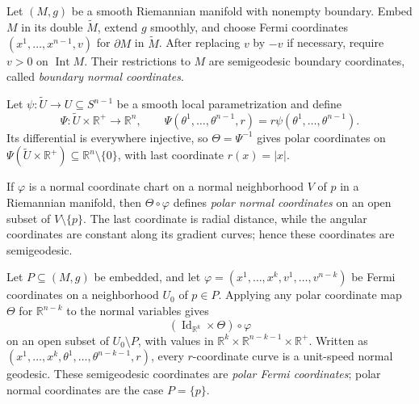 \begin{example}
\label{ex:boundary-normal-coordinates}

Let $(M,g)$ be a smooth Riemannian manifold with nonempty boundary. Embed $M$
in its double $\widetilde M$, extend $g$ smoothly, and choose Fermi coordinates
$(x^1,\ldots,x^{n-1},v)$ for $\partial M$ in $\widetilde M$. After replacing
$v$ by $-v$ if necessary, require $v>0$ on $\operatorname{Int}M$. Their
restrictions to $M$ are semigeodesic boundary coordinates, called
\emph{boundary normal coordinates}.
\end{example}

\begin{example}
\label{ex:polar-normal-coordinates}

Let $\psi:\widetilde U\to U\subseteq S^{n-1}$ be a smooth local
parametrization and define
\[
\Psi:\widetilde U\times\mathbb R^+\to\mathbb R^n,
\qquad
\Psi(\theta^1,\ldots,\theta^{n-1},r)=r\psi(\theta^1,\ldots,\theta^{n-1}).
\]
Its differential is everywhere injective, so $\Theta=\Psi^{-1}$ gives polar
coordinates on
$\Psi(\widetilde U\times\mathbb R^+)\subseteq\mathbb R^n\setminus\{0\}$,
with last coordinate $r(x)=|x|$.

If $\varphi$ is a normal coordinate chart on a normal neighborhood $V$ of
$p$ in a Riemannian manifold, then $\Theta\circ\varphi$ defines
\emph{polar normal coordinates} on an open subset of $V\setminus\{p\}$. The
last coordinate is radial distance, while the angular coordinates are constant
along its gradient curves; hence these coordinates are semigeodesic.
\end{example}

\begin{example}
\label{ex:polar-fermi-coordinates}

Let $P\subseteq(M,g)$ be embedded, and let
$\varphi=(x^1,\ldots,x^k,v^1,\ldots,v^{n-k})$ be Fermi coordinates on a
neighborhood $U_0$ of $p\in P$. Applying any polar coordinate map $\Theta$
for $\mathbb R^{n-k}$ to the normal variables gives
\[
(\operatorname{Id}_{\mathbb R^k}\times\Theta)\circ\varphi
\]
on an open subset of $U_0\setminus P$, with values in
$\mathbb R^k\times\mathbb R^{n-k-1}\times\mathbb R^+$. Written as
$(x^1,\ldots,x^k,\theta^1,\ldots,\theta^{n-k-1},r)$, every $r$-coordinate
curve is a unit-speed normal geodesic. These semigeodesic coordinates are
\emph{polar Fermi coordinates}; polar normal coordinates are the case
$P=\{p\}$.
\end{example}
